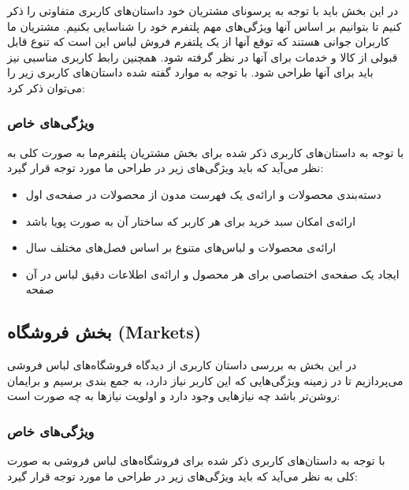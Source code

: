 \documentclass[]{article}
\begin{document}
در این بخش باید با توجه به پرسونای مشتریان خود داستان‌های کاربری متفاوتی
را ذکر کنیم تا بتوانیم بر اساس آنها ویژگی‌های مهم پلتفرم خود را شناسایی
بکنیم. مشتریان ما کاربران جوانی هستند که توقع آنها از یک پلتفرم فروش
لباس این است که تنوع قابل قبولی از کالا و خدمات برای آنها در نظر گرفته
شود. همچنین رابط کاربری مناسبی نیز باید برای آنها طراحی شود. با توجه به
موارد گفته شده داستان‌های کاربری زیر را می‌توان ذکر کرد:

\subsubsection{ویژگی‌های
خاص}\label{ux648ux6ccux698ux6afux6ccux647ux627ux6cc-ux62eux627ux635}

با توجه به داستان‌های کاربری ذکر شده برای بخش مشتریان پلتفرم‌ما به صورت
کلی به نظر می‌آید که باید ویژگی‌های زیر در طراحی ما مورد توجه قرار گیرد:

\begin{itemize}
\item
  دسته‌بندی محصولات و ارائه‌ی یک فهرست مدون از محصولات در صفحه‌ی اول
\item
  ارائه‌ی امکان سبد خرید برای هر کاربر که ساختار آن به صورت پویا باشد
\item
  ارائه‌ی محصولات و لباس‌های متنوع بر اساس فصل‌های مختلف سال
\item
  ایجاد یک صفحه‌ی اختصاصی برای هر محصول و ارائه‌ی اطلاعات دقیق لباس در
  آن صفحه
\end{itemize}

\subsection{بخش فروشگاه
(Markets)}\label{ux628ux62eux634-ux641ux631ux648ux634ux6afux627ux647-markets-1}

در این بخش به بررسی داستان کاربری از دیدگاه فروشگاه‌های لباس فروشی
می‌پردازیم تا در زمینه ویژگی‌هایی که این کاربر نیاز دارد، به جمع بندی
برسیم و برایمان روشن‌تر باشد چه نیازهایی وجود دارد و اولویت نیازها به چه
صورت است:

\subsubsection{ویژگی‌های
خاص}\label{ux648ux6ccux698ux6afux6ccux647ux627ux6cc-ux62eux627ux635-1}

با توجه به داستان‌های کاربری ذکر شده برای فروشگاه‌های لباس فروشی به صورت
کلی به نظر می‌آید که باید ویژگی‌های زیر در طراحی ما مورد توجه قرار گیرد:
\end{document}
